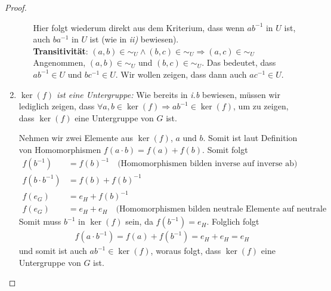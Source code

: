 \documentclass{../problemset}
\begin{document}
\begin{problem}
\begin{proof}
\begin{enumerate}
\begin{enumerate}[label=\alph*)]
			            Hier folgt wiederum direkt aus dem Kriterium, dass wenn $ab^{-1}$ in $U$ ist, auch $ba^{-1}$ in $U$ ist (wie in \textit{ii)} bewiesen). \checkmark \\
			            \textbf{Transitivität}: $(a, b) \in \sim_U \land (b,c) \in \sim_U \Longrightarrow (a,c) \in \sim_U$ \\
			            Angenommen, $(a, b) \in \sim_U$ und $(b, c) \in \sim_U$. Das bedeutet, dass $ab^{-1} \in U$ und $bc^{-1} \in U$. Wir wollen zeigen, dass dann auch $ac^{-1} \in U$.
		      \end{enumerate}
		\item \textit{$\ker(f)$ ist eine Untergruppe:}
		      Wie bereits in \textit{i.b} bewiesen, müssen wir lediglich zeigen, dass $\forall a,b \in \ker(f) \Rightarrow ab^{-1} \in \ker(f)$, um zu zeigen, dass $\ker(f)$ eine Untergruppe von $G$ ist.

		      Nehmen wir zwei Elemente aus $\ker(f)$, $a$ und $b$. Somit ist laut Definition von Homomorphismen $f(a \cdot b) = f(a) + f(b)$. Somit folgt
		      \begin{align}
			      f(b^{-1}) &= f(b)^{-1} \quad \text{(Homomorphismen bilden inverse auf inverse ab)} \\
			      f(b \cdot b^{-1}) &= f(b) + f(b)^{-1} \\
			      f(e_G) &= e_H + f(b)^{-1} \\
			      f(e_G) &= e_H + e_H \quad \text{(Homomorphismen bilden neutrale Elemente auf neutrale Elemente ab)}
		      \end{align}
		      Somit muss $b^{-1}$ in $\ker(f)$ sein, da $f(b^{-1}) = e_H$. Folglich folgt
		      \begin{align}
			      f(a \cdot b^{-1}) = f(a) + f(b^{-1}) = e_H + e_H = e_H
		      \end{align}
		      und somit ist auch $ab^{-1} \in \ker(f)$, woraus folgt, dass $\ker(f)$ eine Untergruppe von $G$ ist.
	\end{enumerate}
\end{proof}
\end{problem}
\end{document}
